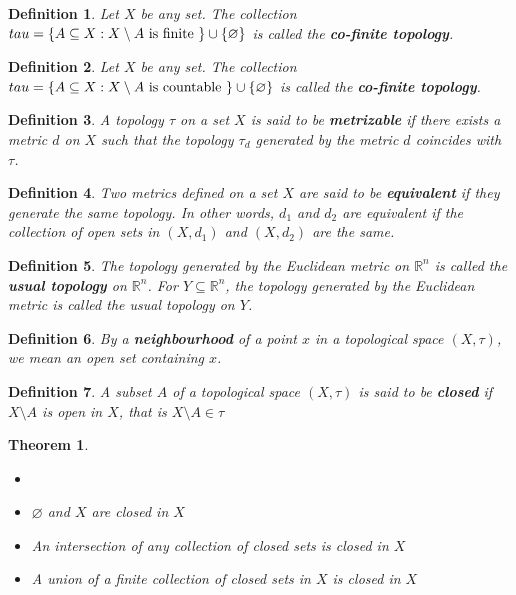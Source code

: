 \documentclass[12pt,twoside]{report}
\newtheorem{defn}{Definition}
\newtheorem{thm}{Theorem}
\begin{document}
\begin{defn}
    Let $X$ be any set. The collection $\\tau = \left\{ A \subseteq X  :  X \setminus A \text{ is finite } \right\} \cup \left\{ \varnothing \right\}$ is called the \textbf{co-finite topology}.
\end{defn}

\begin{defn}
    Let $X$ be any set. The collection $\\tau = \left\{ A \subseteq X  :  X \setminus A \text{ is countable } \right\} \cup \left\{ \varnothing \right\}$ is called the \textbf{co-finite topology}.
\end{defn}



\begin{defn}
A topology $\tau$ on a set $X$ is said to be \textbf{metrizable} if there exists a metric $d$ on $X$ such that the topology $\tau_d$ generated by the metric $d$ coincides with $\tau$.
\end{defn}

\begin{defn}
Two metrics defined on a set $X$ are said to be \textbf{equivalent} if they generate the same topology. 
In other words, $d_1$ and $d_2$ are equivalent if the collection of open sets in $\left (X, d_1\right )$ and $\left (X, d_2\right )$ are the same.
\end{defn}

\begin{defn}
The topology generated by the Euclidean metric on $\mathbb{R} ^n$ is called the \textbf{usual topology} on $\mathbb{R} ^n$.
For $Y \subseteq \mathbb{R} ^n$, the topology generated by the Euclidean metric is called the usual topology on $Y$.
\end{defn}

\begin{defn}
By a \textbf{neighbourhood} of a point $x$ in a topological space $\left (X, \tau\right )$, we mean an open set containing $x$.
\end{defn}

\begin{defn}
A subset $A$ of a topological space $\left (X, \tau\right )$ is said to be \textbf{closed} if $X \setminus A$ is open in $X$, that is $X \setminus A \in \tau$
\end{defn}

\begin{thm}
    \begin{itemize}
        \item[]
        \item  $\varnothing$ and $X$ are closed in $X$
        \item An intersection of any collection of closed sets is closed in $X$
        \item A union of a \textit{finite} collection of closed sets in $X$ is closed in $X$
    \end{itemize}
\end{thm}
\end{document}
